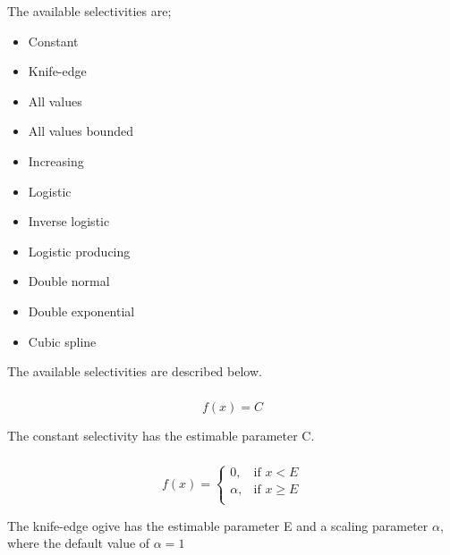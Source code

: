 The available selectivities are;

\begin{itemize}
  \item Constant
  \item Knife-edge
  \item All values
  \item All values bounded
  \item Increasing
  \item Logistic
	\item Inverse logistic
  \item Logistic producing
  \item Double normal
  \item Double exponential
	\item Cubic spline
\end{itemize}

The available selectivities are described below.

\subsubsection[Constant]{}

\begin{equation}
f(x)=C
\end{equation}

The constant selectivity has the estimable parameter C. 

\subsubsection[Knife-edge]{}

\begin{equation}
f(x)= \begin{cases}
  0, & \text{if $x < E$} \\
  \alpha, & \text{if $x \ge E$}\\ 
  \end{cases} 
\end{equation}

The knife-edge ogive has the estimable parameter E and a scaling parameter $\alpha$, where the default value of $\alpha = 1$

\subsubsection[All-values]{}

